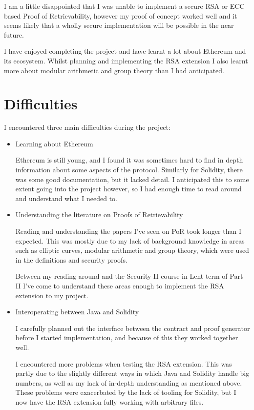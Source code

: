 \documentclass[12pt,a4paper,twoside,openright]{report}
\begin{document}
I am a little disappointed that I was unable to implement a secure RSA or ECC based Proof of Retrievability,
however my proof of concept worked well and it seems likely that a wholly secure implementation will be possible in the near future.

I have enjoyed completing the project and have learnt a lot about Ethereum and its ecosystem.
Whilst planning and implementing the RSA extension I also learnt more about modular arithmetic and group theory than I had
anticipated.

\section{Difficulties}
I encountered three main difficulties during the project:
\begin{itemize}
\item Learning about Ethereum

Ethereum is still young, and I found it was sometimes hard to find in depth information about some aspects of the protocol.
Similarly for Solidity, there was some good documentation, but it lacked detail.
I anticipated this to some extent going into the project however, so I had enough time to read around and understand what I needed to.

\item Understanding the literature on Proofs of Retrievability

Reading and understanding the papers I've seen on PoR took longer than I expected.
This was mostly due to my lack of background knowledge in areas such as elliptic curves, modular arithmetic
and group theory, which were used in the definitions and security proofs.

Between my reading around and the Security II course in Lent term of Part II
I've come to understand these areas enough to implement the RSA extension to my project.

\item Interoperating between Java and Solidity

I carefully planned out the interface between the contract and proof generator before I started implementation,
and because of this they worked together well.

I encountered more problems when testing the RSA extension.
This was partly due to the slightly different ways in which Java and Solidity handle big numbers,
as well as my lack of in-depth understanding as mentioned above.
These problems were exacerbated by the lack of tooling for Solidity, but I now have the RSA extension fully working with arbitrary files.
\end{itemize}
\end{document}
